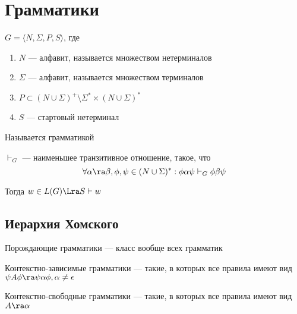 
\section{Грамматики}

\begin{definition}
    \(G = \langle N, \Sigma, P, S \rangle\), где 
    \begin{enumerate}
        \item \(N\) --- алфавит, называется множеством нетерминалов
        \item \(\Sigma\) --- алфавит, называется множеством терминалов
        \item \(P \subset (N \cup \Sigma)^+ \setminus \Sigma^* \times (N \cup \Sigma)^*\)
        \item \(S\) --- стартовый нетерминал
    \end{enumerate}
    Называется грамматикой
\end{definition}

\begin{definition}
    \(\vdash_G\) --- наименьшее транзитивное отношение, такое, что 
    \[\forall \alpha \ra \beta, \phi, \psi \in (N \cup \Sigma)^*: \phi \alpha \psi \vdash_G \phi\beta\psi\]
\end{definition}

\begin{corollary}
    Тогда \(w \in L(G) \Lra S \vdash w\)
\end{corollary}

\subsection{Иерархия Хомского}
\begin{definition}
    Порождающие грамматики --- класс вообще всех грамматик
\end{definition}

\begin{definition}
    Контекстно-зависимые грамматики --- такие, в которых все правила имеют вид \(\psi A \phi \ra \psi \alpha \phi, \alpha \ne \epsilon\)
\end{definition}

\begin{definition}
    Контекстно-свободные грамматики --- такие, в которых все правила имеют вид \(A \ra \alpha\)
\end{definition}

